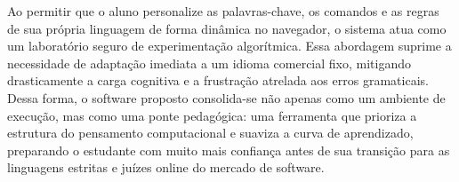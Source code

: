 Ao permitir que o aluno personalize as palavras-chave, os comandos e as regras de sua própria linguagem de forma dinâmica no navegador, o sistema atua como um laboratório seguro de experimentação algorítmica. Essa abordagem suprime a necessidade de adaptação imediata a um idioma comercial fixo, mitigando drasticamente a carga cognitiva e a frustração atrelada aos erros gramaticais. Dessa forma, o software proposto consolida-se não apenas como um ambiente de execução, mas como uma ponte pedagógica: uma ferramenta que prioriza a estrutura do pensamento computacional e suaviza a curva de aprendizado, preparando o estudante com muito mais confiança antes de sua transição para as linguagens estritas e juízes online do mercado de software.



\label{sec:trabalhos-relacionados}


